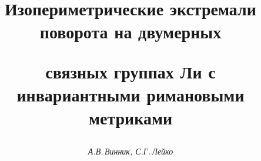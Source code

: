 

 


%  


\newcommand{\down}[2]{\underset{#1}{#2}{}} 


\newcommand{\const}{\operatorname{const}} 


\newcommand{\Aff}{\operatorname{Aff}} 


\newcommand{\tts}[1]{} 


 




 


\setcounter{page}{3} 












 


\author{\it А.В.\,Винник, С.Г.\,Лейко} 




\title{Изопериметрические экстремали поворота на двумерных 


связных группах Ли с инвариантными римановыми метриками} 


 


\date{} 




\pagestyle{plain} %


 




\maketitle 


